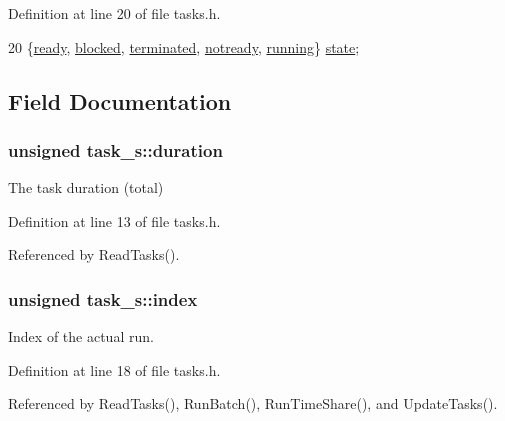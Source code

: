 Definition at line 20 of file tasks.\-h.


\begin{DoxyCode}
20 \{\hyperlink{structtask__s_aa3df0abff146e014f8a8097a8d77f2a9ac5f97202e60f558dad8ceb51418f55cf}{ready}, \hyperlink{structtask__s_aa3df0abff146e014f8a8097a8d77f2a9ab188ab2fbb2d1968e0d745b6e9c16a6f}{blocked}, \hyperlink{structtask__s_aa3df0abff146e014f8a8097a8d77f2a9acfe200aefdf28af1def22dd0aebf4f37}{terminated}, \hyperlink{structtask__s_aa3df0abff146e014f8a8097a8d77f2a9ae13643df062b2be44c6ad6207bac155f}{notready}, \hyperlink{structtask__s_aa3df0abff146e014f8a8097a8d77f2a9a8d3c3c9cc584db42a24e6d9ac6cc9673}{running}\} 
      \hyperlink{structtask__s_ae7a9cf3d567939ba2c9866cdfba022d8}{state}; 
\end{DoxyCode}


\subsection{Field Documentation}
\hypertarget{structtask__s_a7621a6cb55465ce0be17f7e56c5aa908}{
\subsubsection[{duration}]{\setlength{\rightskip}{0pt plus 5cm}unsigned task\-\_\-s\-::duration}}\label{structtask__s_a7621a6cb55465ce0be17f7e56c5aa908}


The task duration (total) 



Definition at line 13 of file tasks.\-h.



Referenced by Read\-Tasks().

\hypertarget{structtask__s_a0148e6caffa1e820ec07130799c22565}{
\subsubsection[{index}]{\setlength{\rightskip}{0pt plus 5cm}unsigned task\-\_\-s\-::index}}\label{structtask__s_a0148e6caffa1e820ec07130799c22565}


Index of the actual run. 



Definition at line 18 of file tasks.\-h.



Referenced by Read\-Tasks(), Run\-Batch(), Run\-Time\-Share(), and Update\-Tasks().

